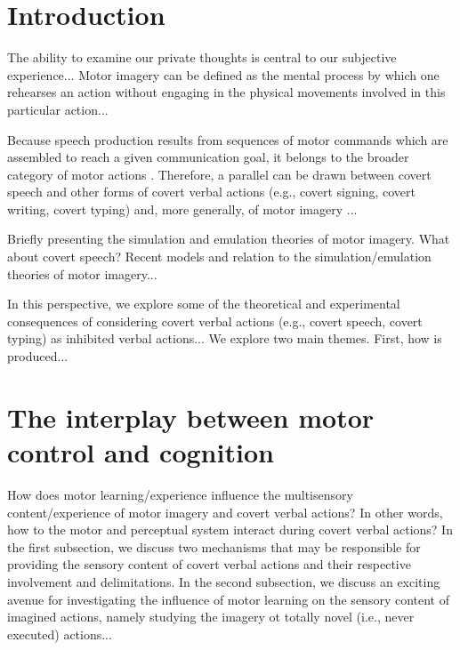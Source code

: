 \documentclass[utf8]{template/frontiersSCNS} %
\begin{document}
\newpage

\section{Introduction}


The ability to examine our private thoughts is central to our subjective experience... Motor imagery can be defined as the mental process by which one rehearses an action without engaging in the physical movements involved in this particular action...

Because speech production results from sequences of motor commands which are assembled to reach a given communication goal, it belongs to the broader category of motor actions \citep{jeannerod_motor_2006}. Therefore, a parallel can be drawn between covert speech and other forms of covert verbal actions (e.g., covert signing, covert writing, covert typing) and, more generally, of motor imagery \citep{alderson-day_inner_2015, perrone-bertolotti_what_2014, loevenbruck_cognitive_2018}...

Briefly presenting the simulation and emulation theories of motor imagery. What about covert speech? Recent models and relation to the simulation/emulation theories of motor imagery...

In this perspective, we explore some of the theoretical and experimental consequences of considering covert verbal actions (e.g., covert speech, covert typing) as inhibited verbal actions... We explore two main themes. First, how is produced...

\section{The interplay between motor control and cognition}

How does motor learning/experience influence the multisensory content/experience of motor imagery and covert verbal actions? In other words, how to the motor and perceptual system interact during covert verbal actions? In the first subsection, we discuss two mechanisms that may be responsible for providing the sensory content of covert verbal actions and their respective involvement and delimitations. In the second subsection, we discuss an exciting avenue for investigating the influence of motor learning on the sensory content of imagined actions, namely studying the imagery ot totally novel (i.e., never executed) actions...
\end{document}
